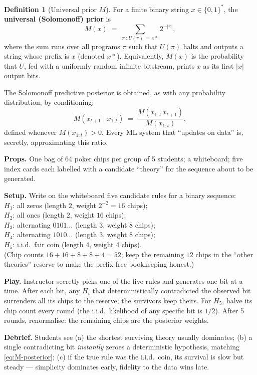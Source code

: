 \documentclass[12pt,a4paper]{article}
\theoremstyle{plain}
\theoremstyle{definition}
\newtheorem{definition}[theorem]{Definition}
\begin{document}
\begin{definition}[Universal prior $M$]
\label{def:M}
For a finite binary string $x \in \{0,1\}^*$, the \textbf{universal
(Solomonoff) prior} is
\begin{equation}
  M(x) \;=\; \sum_{\pi \,:\, U(\pi)\, =\, x *} 2^{-|\pi|},
  \label{eq:M}
\end{equation}
where the sum runs over all programs $\pi$ such that $U(\pi)$ halts
and outputs a string whose prefix is $x$ (denoted $x*$).
Equivalently, $M(x)$ is the probability that $U$, fed with a
uniformly random infinite bitstream, prints $x$ as its first $|x|$
output bits.
\end{definition}

\noindent The Solomonoff predictive posterior is obtained, as with any
probability distribution, by conditioning:
\begin{equation}
  M(x_{t+1} \mid x_{1:t}) \;=\; \frac{M(x_{1:t}\,x_{t+1})}{M(x_{1:t})},
  \label{eq:M-posterior}
\end{equation}
defined whenever $M(x_{1:t}) > 0$.  Every ML system that ``updates on
data'' is, secretly, approximating this ratio.

\begin{activity}[title={Classroom prediction market --- 5 rounds, 10 min}]
\label{act:prediction-market}
\textbf{Props.}  One bag of 64 poker chips per group of 5 students; a
whiteboard; five index cards each labelled with a candidate
``theory'' for the sequence about to be generated.

\textbf{Setup.}  Write on the whiteboard five candidate rules for a
binary sequence: \\
$H_1$: all zeros (length $2$, weight $2^{-2}=16$ chips); \\
$H_2$: all ones (length $2$, weight $16$ chips); \\
$H_3$: alternating $0101\ldots$ (length $3$, weight $8$ chips); \\
$H_4$: alternating $1010\ldots$ (length $3$, weight $8$ chips); \\
$H_5$: i.i.d.\ fair coin (length $4$, weight $4$ chips). \\
(Chip counts $16+16+8+8+4=52$; keep the remaining $12$ chips in the
``other theories'' reserve to make the prefix-free bookkeeping
honest.)

\textbf{Play.}  Instructor secretly picks one of the five rules and
generates one bit at a time.  After each bit, any $H_i$ that
deterministically contradicted the observed bit surrenders all its
chips to the reserve; the survivors keep theirs.  For $H_5$, halve
its chip count every round (the i.i.d.\ likelihood of any specific
bit is $1/2$).  After 5 rounds, renormalise: the remaining chips are
the posterior weights.

\textbf{Debrief.}  Students see (a) the shortest surviving theory
usually dominates; (b) a single contradicting bit \emph{instantly}
zeroes a deterministic hypothesis, matching
\eqref{eq:M-posterior}; (c) if the true rule was the i.i.d.\ coin,
its survival is slow but steady --- simplicity dominates early,
fidelity to the data wins late.
\end{activity}
\end{document}
